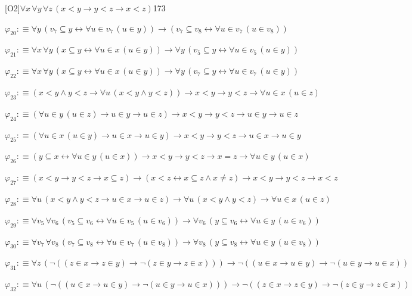 \begin{fullproof}{[O2]}{$\forall x\,\forall y\,\forall z\,(x < y \to y < z \to x < z)$}{173}
\begin{abbrevlist}
\item $\varphi_{20} :\equiv \forall y\,(v_{7} \subseteq y \leftrightarrow \forall u \in v_{7}\,(u \in y)) \to (v_{7} \subseteq v_{8} \leftrightarrow \forall u \in v_{7}\,(u \in v_{8}))$
\item $\varphi_{21} :\equiv \forall x\,\forall y\,(x \subseteq y \leftrightarrow \forall u \in x\,(u \in y)) \to \forall y\,(v_{5} \subseteq y \leftrightarrow \forall u \in v_{5}\,(u \in y))$
\item $\varphi_{22} :\equiv \forall x\,\forall y\,(x \subseteq y \leftrightarrow \forall u \in x\,(u \in y)) \to \forall y\,(v_{7} \subseteq y \leftrightarrow \forall u \in v_{7}\,(u \in y))$
\item $\varphi_{23} :\equiv (x < y \land y < z \to \forall u\,(x < y \land y < z)) \to x < y \to y < z \to \forall u \in x\,(u \in z)$
\item $\varphi_{24} :\equiv (\forall u \in y\,(u \in z) \to u \in y \to u \in z) \to x < y \to y < z \to u \in y \to u \in z$
\item $\varphi_{25} :\equiv (\forall u \in x\,(u \in y) \to u \in x \to u \in y) \to x < y \to y < z \to u \in x \to u \in y$
\item $\varphi_{26} :\equiv (y \subseteq x \leftrightarrow \forall u \in y\,(u \in x)) \to x < y \to y < z \to x = z \to \forall u \in y\,(u \in x)$
\item $\varphi_{27} :\equiv (x < y \to y < z \to x \subseteq z) \to (x < z \leftrightarrow x \subseteq z \land x \neq z) \to x < y \to y < z \to x < z$
\item $\varphi_{28} :\equiv \forall u\,(x < y \land y < z \to u \in x \to u \in z) \to \forall u\,(x < y \land y < z) \to \forall u \in x\,(u \in z)$
\item $\varphi_{29} :\equiv \forall v_{5}\,\forall v_{6}\,(v_{5} \subseteq v_{6} \leftrightarrow \forall u \in v_{5}\,(u \in v_{6})) \to \forall v_{6}\,(y \subseteq v_{6} \leftrightarrow \forall u \in y\,(u \in v_{6}))$
\item $\varphi_{30} :\equiv \forall v_{7}\,\forall v_{8}\,(v_{7} \subseteq v_{8} \leftrightarrow \forall u \in v_{7}\,(u \in v_{8})) \to \forall v_{8}\,(y \subseteq v_{8} \leftrightarrow \forall u \in y\,(u \in v_{8}))$
\item $\varphi_{31} :\equiv \forall z\,(\neg ((z \in x \to z \in y) \to \neg (z \in y \to z \in x))) \to \neg ((u \in x \to u \in y) \to \neg (u \in y \to u \in x))$
\item $\varphi_{32} :\equiv \forall u\,(\neg ((u \in x \to u \in y) \to \neg (u \in y \to u \in x))) \to \neg ((z \in x \to z \in y) \to \neg (z \in y \to z \in x))$

\end{abbrevlist}
\end{fullproof}
